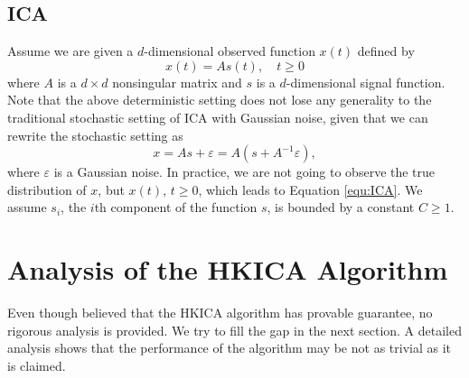 \documentclass[twoside]{article}
\theoremstyle{definition}
\newcommand{\eps}{\varepsilon}
\begin{document}
\subsection{ICA}
\label{subsec:ICA}
Assume we are given a $d$-dimensional observed function $x(t)$ defined by  
\begin{equation}
\label{equ:ICA}
x(t) = As(t), \quad t\ge0
\end{equation}
where $A$ is a $d\times d$ nonsingular matrix and  $s$ is a $d$-dimensional signal function. 
Note that the above deterministic setting does not lose any generality to the traditional stochastic setting of ICA with Gaussian noise, given that we can rewrite the stochastic setting as 
\[
x = As+\eps = A(s+A^{-1}\eps),
\] 
where $\eps$ is a Gaussian noise. In practice, we are not going to observe the true distribution of $x$, but $x(t)$, $t\ge 0$, which leads to Equation \eqref{equ:ICA}.
We assume $s_i$, the $i$th component of the function $s$, is bounded by a constant $C\ge 1$.

\section{Analysis of the HKICA Algorithm}
\label{sec:AnalysisHK}
Even though \citet{hsu2013learning} believed that the HKICA algorithm has provable guarantee, no rigorous analysis is provided. 
We try to fill the gap in the next section. 
A detailed analysis shows that the performance of the algorithm may be not as trivial as it is claimed.
\end{document}
